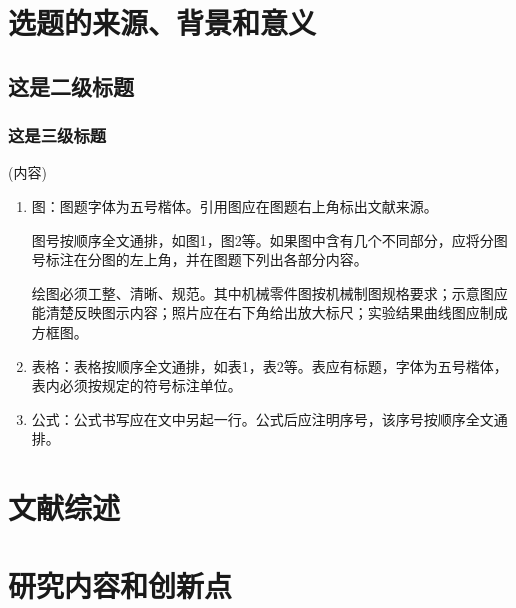 \documentclass{suesreport}
\begin{document}
    \pagestyle{empty}
    \makecover
    \begin{abstract}
        (摘要内容)摘要部分要求是：宋体，五号，1.25倍行间距，首行缩进2字符，500字左右。

        关键词部分，宋体，五号，关键词数量4-6个，用逗号分隔，末尾不打标点符号

    \end{abstract}
    \begin{center}
        \heiti{}

        \wuhao\qquad
    \end{center}
    \section{选题的来源、背景和意义}
    \subsection{这是二级标题}
    \subsubsection{这是三级标题}
     (内容)

     \begin{enumerate}[label=\arabic*. ]
        \item 图：图题字体为五号楷体。引用图应在图题右上角标出文献来源。
        
        图号按顺序全文通排，如图1，图2等。如果图中含有几个不同部分，应将分图号标注在分图的左上角，并在图题下列出各部分内容。
        
        绘图必须工整、清晰、规范。其中机械零件图按机械制图规格要求；示意图应能清楚反映图示内容；照片应在右下角给出放大标尺；实验结果曲线图应制成方框图。
        \item 表格：表格按顺序全文通排，如表1，表2等。表应有标题，字体为五号楷体，表内必须按规定的符号标注单位。
        \item 公式：公式书写应在文中另起一行。公式后应注明序号，该序号按顺序全文通排。
     \end{enumerate}
    \section{文献综述}

    \section{研究内容和创新点}
\end{document}
